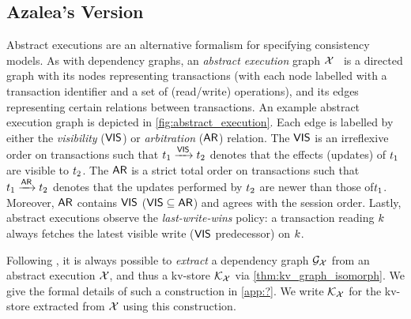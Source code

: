 

\subsection{Azalea's Version}
Abstract executions \cite{ev_transactions,framework-concur} are an alternative formalism for specifying consistency models. 
As with dependency graphs, an \emph{abstract execution} graph $\mathcal{X}$~\cite{??} 
is a directed graph with its nodes representing transactions (with each node labelled with a transaction identifier and a set of (read/write) operations), 
and its edges representing certain relations between transactions. 
An example abstract execution graph is depicted in \cref{fig:abstract_execution}. 
Each edge is labelled by either the \emph{visibility} ($\mathsf{VIS}$) or \emph{arbitration} ($\mathsf{AR}$) relation. 
The $\mathsf{VIS}$ is an irreflexive order on transactions such that $t_1 \xrightarrow{\mathsf{VIS}} t_2$ denotes that the effects (updates) of $t_1$ are visible to $t_2$. 
The $\mathsf{AR}$ is a strict total order on transactions such that $t_1 \xrightarrow{\mathsf{AR}} t_2$ denotes that the updates performed by $t_2$ are newer than those of$t_1$. 
Moreover, $\mathsf{AR}$ contains $\mathsf{VIS}$ ($\mathsf{VIS} \subseteq \mathsf{AR}$) and agrees with the session order.
Lastly, abstract executions observe the \emph{last-write-wins} policy: 
a transaction reading $k$ always fetches the latest visible write ($\mathsf{VIS}$ predecessor) on $k$.

Following \cite{laws}, it is always possible to \emph{extract} a dependency graph $\mathcal{G}_{\mathcal{X}}$ from an abstract execution $\mathcal{X}$, and thus a kv-store $\mathcal{K}_{\mathcal{X}}$ via \cref{thm:kv_graph_isomorph}. We give the formal details of such a construction in \cref{app:?}.
We write  $\mathcal{K}_{\mathcal{X}}$ for the kv-store extracted from $\mathcal{X}$ using this construction.  


